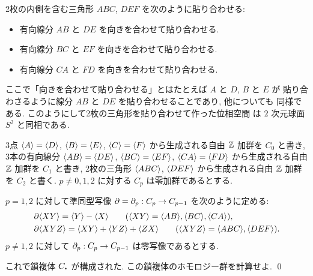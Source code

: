 \documentclass[12pt,twoside]{jarticle}
\begin{document}
\begin{question}
\label{q:S^2-Delta}
  2枚の内側を含む三角形 $ABC$, $DEF$ を次のように貼り合わせる:
  \begin{itemize}
  \item 有向線分 $AB$ と $DE$ を向きを合わせて貼り合わせる. 
  \item 有向線分 $BC$ と $EF$ を向きを合わせて貼り合わせる. 
  \item 有向線分 $CA$ と $FD$ を向きを合わせて貼り合わせる. 
  \end{itemize}
  ここで「向きを合わせて貼り合わせる」とはたとえば $A$ と $D$, $B$ と $E$ が
  貼り合わさるように線分 $AB$ と $DE$ を貼り合わせることであり, 他についても
  同様である. このようにして2枚の三角形を貼り合わせて作った位相空間
  は $2$ 次元球面 $S^2$ と同相である.

  3点 %
  $\langle A\rangle =\langle D\rangle$, 
  $\langle B\rangle =\langle E\rangle$, 
  $\langle C\rangle =\langle F\rangle$ から生成される自由 ${\mathbb Z}$ 加群を $C_0$ と書き, 
  3本の有向線分 %
  $\langle AB\rangle = \langle DE\rangle$, 
  $\langle BC\rangle = \langle EF\rangle$, 
  $\langle CA\rangle = \langle FD\rangle$ から生成される自由 ${\mathbb Z}$ 加群を $C_1$ と書き, 
  2枚の三角形 %
  $\langle ABC\rangle$, $\langle DEF\rangle$ から生成される自由 ${\mathbb Z}$ 加群を $C_2$ と書く.
  $p\ne 0,1,2$ に対する $C_p$ は零加群であるとする.

  $p=1,2$ に対して準同型写像 $\partial=\partial_p:C_p\to C_{p-1}$ を次のように定める:
  \begin{align*}
    &
    \partial\langle XY\rangle = \langle Y\rangle - \langle X\rangle
    \qquad (\langle XY\rangle = \langle AB\rangle, \langle BC\rangle, \langle CA\rangle),
    \\ &
    \partial\langle XYZ\rangle = \langle XY\rangle + \langle YZ\rangle + \langle ZX\rangle
    \qquad (\langle XYZ\rangle = \langle ABC\rangle, \langle DEF\rangle).
  \end{align*}
  $p\ne 1,2$ に対して $\partial_p:C_p\to C_{p-1}$ は零写像であるとする.
 
  これで鎖複体 $C_\bcdot$ が構成された.
  この鎖複体のホモロジー群を計算せよ.
  \qed
\end{question}
\end{document}
